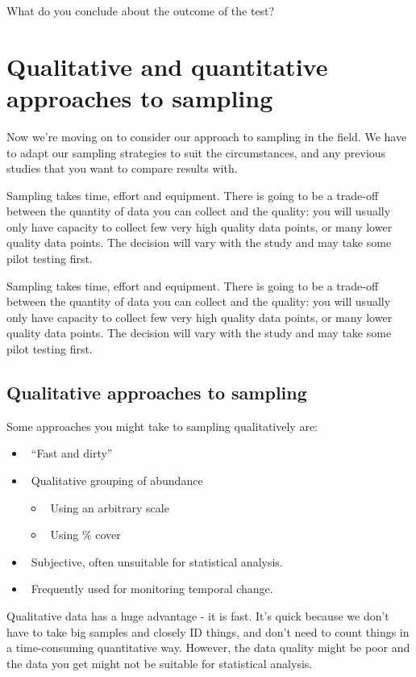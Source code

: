 \documentclass[
  letterpaper,
  DIV=11,
  numbers=noendperiod]{scrreprt}
\providecommand{\tightlist}{%
  \setlength{\itemsep}{0pt}\setlength{\parskip}{0pt}}
\begin{document}
What do you conclude about the outcome of the test?

\chapter{Qualitative and quantitative approaches to
sampling}\label{sec-qual-and-quant}

Now we're moving on to consider our approach to sampling in the field.
We have to adapt our sampling strategies to suit the circumstances, and
any previous studies that you want to compare results with.

Sampling takes time, effort and equipment. There is going to be a
trade-off between the quantity of data you can collect and the quality:
you will usually only have capacity to collect few very high quality
data points, or many lower quality data points. The decision will vary
with the study and may take some pilot testing first.

Sampling takes time, effort and equipment. There is going to be a
trade-off between the quantity of data you can collect and the quality:
you will usually only have capacity to collect few very high quality
data points, or many lower quality data points. The decision will vary
with the study and may take some pilot testing first.

\section{Qualitative approaches to
sampling}\label{qualitative-approaches-to-sampling}

Some approaches you might take to sampling qualitatively are:

\begin{itemize}
\tightlist
\item
  ~``Fast and dirty''
\item
  ~Qualitative grouping of abundance

  \begin{itemize}
  \tightlist
  \item
    ~Using an arbitrary scale
  \item
    ~Using \% cover
  \end{itemize}
\item
  ~Subjective, often unsuitable for statistical analysis.
\item
  ~Frequently used for monitoring temporal change.
\end{itemize}

Qualitative data has a huge advantage - it is fast. It's quick because
we don't have to take big samples and closely ID things, and don't need
to count things in a time-consuming quantitative way. However, the data
quality might be poor and the data you get might not be suitable for
statistical analysis.
\end{document}
